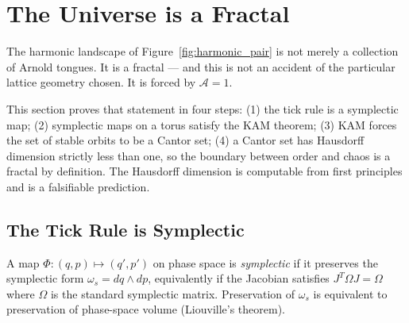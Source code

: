 
\section{The Universe is a Fractal}
\label{sec:fractal}

The harmonic landscape of Figure~\ref{fig:harmonic_pair} is not merely a
collection of Arnold tongues.
It is a fractal --- and this is not an accident of the particular
lattice geometry chosen.
It is forced by $\mathcal{A}=1$.

This section proves that statement in four steps: (1) the tick rule is
a symplectic map; (2) symplectic maps on a torus satisfy the KAM
theorem; (3) KAM forces the set of stable orbits to be a Cantor set;
(4) a Cantor set has Hausdorff dimension strictly less than one, so the
boundary between order and chaos is a fractal by definition.
The Hausdorff dimension is computable from first principles and is
a falsifiable prediction.

\subsection{The Tick Rule is Symplectic}
\label{subsec:symplectic}

A map $\Phi : (q, p) \mapsto (q', p')$ on phase space is
\emph{symplectic} if it preserves the symplectic form
$\omega_s = dq \wedge dp$, equivalently if the Jacobian satisfies
$J^T \Omega J = \Omega$ where $\Omega$ is the standard symplectic
matrix.  Preservation of $\omega_s$ is equivalent to preservation of
phase-space volume (Liouville's theorem).

